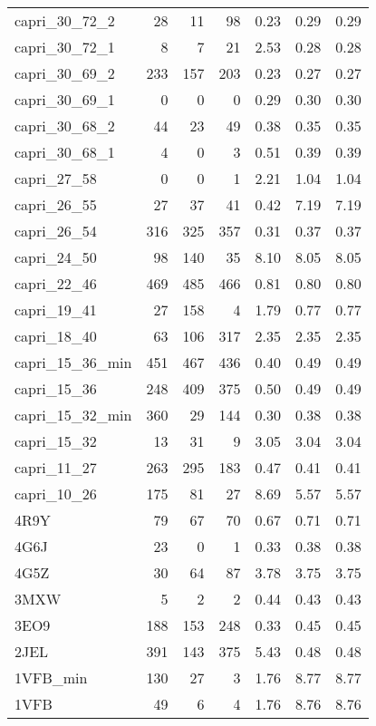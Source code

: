 \begin{table}[h]
\begin{center}
\begin{tabular}{ l | r | r | r | c | c | c }
       capri\_30\_72\_2 & 28 & 11 & 98 & 0.23 & 0.29 & 0.29 \\
       capri\_30\_72\_1 & 8 & 7 & 21 & 2.53 & 0.28 & 0.28 \\
       capri\_30\_69\_2 & 233 & 157 & 203 & 0.23 & 0.27 & 0.27 \\
       capri\_30\_69\_1 & 0 & 0 & 0 & 0.29 & 0.30 & 0.30 \\
       capri\_30\_68\_2 & 44 & 23 & 49 & 0.38 & 0.35 & 0.35 \\
       capri\_30\_68\_1 & 4 & 0 & 3 & 0.51 & 0.39 & 0.39 \\
       capri\_27\_58 & 0 & 0 & 1 & 2.21 & 1.04 & 1.04 \\
       capri\_26\_55 & 27 & 37 & 41 & 0.42 & 7.19 & 7.19 \\
       capri\_26\_54 & 316 & 325 & 357 & 0.31 & 0.37 & 0.37 \\
       capri\_24\_50 & 98 & 140 & 35 & 8.10 & 8.05 & 8.05 \\
       capri\_22\_46 & 469 & 485 & 466 & 0.81 & 0.80 & 0.80 \\
       capri\_19\_41 & 27 & 158 & 4 & 1.79 & 0.77 & 0.77 \\
       capri\_18\_40 & 63 & 106 & 317 & 2.35 & 2.35 & 2.35 \\
       capri\_15\_36\_min & 451 & 467 & 436 & 0.40 & 0.49 & 0.49 \\
       capri\_15\_36 & 248 & 409 & 375 & 0.50 & 0.49 & 0.49 \\
       capri\_15\_32\_min & 360 & 29 & 144 & 0.30 & 0.38 & 0.38 \\
       capri\_15\_32 & 13 & 31 & 9 & 3.05 & 3.04 & 3.04 \\
       capri\_11\_27 & 263 & 295 & 183 & 0.47 & 0.41 & 0.41 \\
       capri\_10\_26 & 175 & 81 & 27 & 8.69 & 5.57 & 5.57 \\
       4R9Y & 79 & 67 & 70 & 0.67 & 0.71 & 0.71 \\
       4G6J & 23 & 0 & 1 & 0.33 & 0.38 & 0.38 \\
       4G5Z & 30 & 64 & 87 & 3.78 & 3.75 & 3.75 \\
       3MXW & 5 & 2 & 2 & 0.44 & 0.43 & 0.43 \\
       3EO9 & 188 & 153 & 248 & 0.33 & 0.45 & 0.45 \\
       2JEL & 391 & 143 & 375 & 5.43 & 0.48 & 0.48 \\
       1VFB\_min & 130 & 27 & 3 & 1.76 & 8.77 & 8.77 \\
       1VFB & 49 & 6 & 4 & 1.76 & 8.76 & 8.76 \\

\end{tabular}
\end{center}
\end{table}
